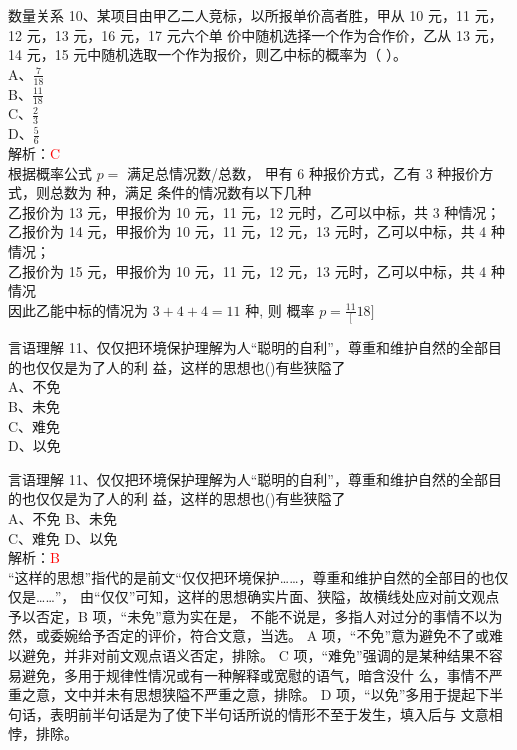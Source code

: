 \documentclass[aspectratio=169]{beamer}
\begin{document}
\begin{frame}[t]{数量关系}
    10、某项目由甲乙二人竞标，以所报单价高者胜，甲从 10 元，11 元，12 元，13 元，16 元，17 元六个单
价中随机选择一个作为合作价，乙从 13 元，14 元，15 元中随机选取一个作为报价，则乙中标的概率为（ ）。\\
    A、$\frac{7}{18}$  \\
    B、$\frac{11}{18}$ \\
    C、$\frac{2}{3} $  \\
    D、$\frac{5}{6} $  \\
    解析：\textcolor{red}{C}\\
    根据概率公式 $p=$ 满足总情况数/总数， 甲有 6 种报价方式，乙有 3 种报价方式，则总数为 种，满足
条件的情况数有以下几种\\
乙报价为 13 元，甲报价为 10 元，11 元，12 元时，乙可以中标，共 3 种情况；\\
乙报价为 14 元，甲报价为 10 元，11 元，12 元，13 元时，乙可以中标，共 4 种情况；\\
乙报价为 15 元，甲报价为 10 元，11 元，12 元，13 元时，乙可以中标，共 4 种情况\\
    因此乙能中标的情况为 $3+4+4 = 11$ 种, 则 概率 $p=\frac{11}[18]$\\

\end{frame}



\begin{frame}[t]{言语理解}
    11、仅仅把环境保护理解为人“聪明的自利”，尊重和维护自然的全部目的也仅仅是为了人的利
    益，这样的思想也()有些狭隘了\\
A、不免\\
B、未免\\
C、难免\\
D、以免\\
\end{frame}

\begin{frame}[t]{言语理解}
    11、仅仅把环境保护理解为人“聪明的自利”，尊重和维护自然的全部目的也仅仅是为了人的利
    益，这样的思想也()有些狭隘了\\
A、不免 \qquad B、未免\\
C、难免 \qquad  D、以免\\
    解析：\textcolor{red}{B}\\
“这样的思想”指代的是前文“仅仅把环境保护……，尊重和维护自然的全部目的也仅仅是……”，
由“仅仅”可知，这样的思想确实片面、狭隘，故横线处应对前文观点予以否定，B 项，“未免”意为实在是，
不能不说是，多指人对过分的事情不以为然，或委婉给予否定的评价，符合文意，当选。
A 项，“不免”意为避免不了或难以避免，并非对前文观点语义否定，排除。
C 项，“难免”强调的是某种结果不容易避免，多用于规律性情况或有一种解释或宽慰的语气，暗含没什
么，事情不严重之意，文中并未有思想狭隘不严重之意，排除。
D 项，“以免”多用于提起下半句话，表明前半句话是为了使下半句话所说的情形不至于发生，填入后与
文意相悖，排除。
\end{frame}
\end{document}
